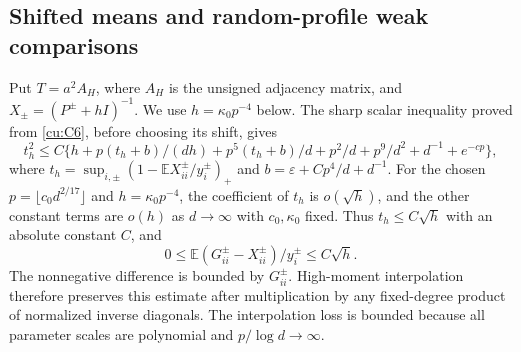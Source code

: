 \documentclass[10pt]{article}
\numberwithin{equation}{section}
\newcommand{\1}{\mathbf1}
\begin{document}
\subsection{Shifted means and random-profile weak comparisons}

Put $T=a^2A_H$, where $A_H$ is the unsigned adjacency matrix, and
$X_\pm=(P^\pm+hI)^{-1}$. We use $h=\kappa_0p^{-4}$ below.
The sharp scalar inequality proved from \eqref{cu:C6}, before choosing
its shift, gives
\[
 t_h^2\le C\{h+p(t_h+b)/(dh)+p^5(t_h+b)/d
                    +p^2/d+p^9/d^2+d^{-1}+e^{-cp}\},
\]
where $t_h=\sup_{i,\pm}(1-\mathbb EX^\pm_{ii}/y_i^\pm)_+$ and
$b=\varepsilon+Cp^4/d+d^{-1}$. For the chosen $p=\lfloor c_0d^{2/17}\rfloor$ and
$h=\kappa_0p^{-4}$, the coefficient of $t_h$ is $o(\sqrt h)$,
and the other constant terms are $o(h)$ as $d\to\infty$ with
$c_0,\kappa_0$ fixed. Thus $t_h\le C\sqrt h$ with an absolute
constant $C$, and
\[
 0\le\mathbb E(G^\pm_{ii}-X^\pm_{ii})/y_i^\pm\le C\sqrt h.
 \tag{S1}\label{eq:mean-shift}
\]
The nonnegative difference is bounded by $G^\pm_{ii}$.
High-moment interpolation therefore preserves this estimate after
multiplication by any fixed-degree product of normalized inverse
diagonals. The interpolation loss is bounded because all parameter
scales are polynomial and $p/\log d\to\infty$.
\end{document}
